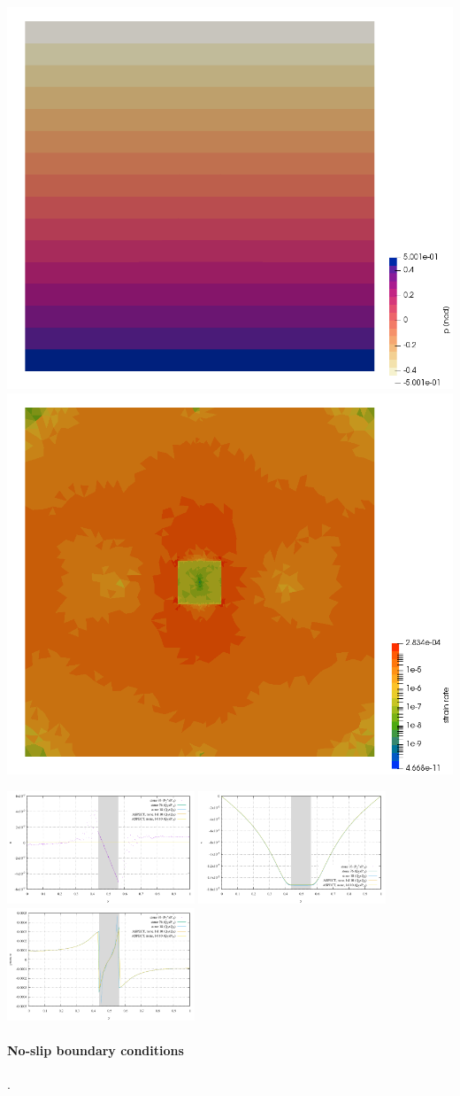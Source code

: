 \begin{center}
\includegraphics[width=5.cm]{images/sinking_block/FS/stone93/press}
\includegraphics[width=5.cm]{images/sinking_block/FS/stone93/sr}
\end{center}

\begin{center}
\includegraphics[width=5.6cm]{images/sinking_block/u_FS}
\includegraphics[width=5.6cm]{images/sinking_block/v_FS}
\includegraphics[width=5.6cm]{images/sinking_block/pressure_FS}
\end{center}

\paragraph{No-slip boundary conditions}.

